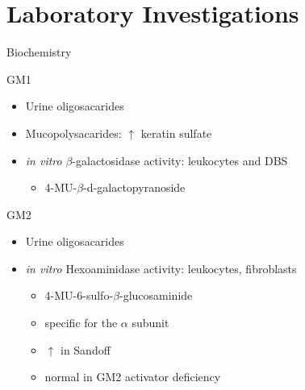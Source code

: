 \documentclass[presentation, smaller]{beamer}
\begin{document}
\section{Laboratory Investigations}
\label{sec:orgheadline17}

\begin{frame}[label={sec:orgheadline16}]{Biochemistry}
\begin{block}{GM1}
\begin{itemize}
\item Urine oligosacarides
\item Mucopolysacarides: \(\uparrow\) keratin sulfate
\item \emph{in vitro} \(\beta\)-galactosidase activity: leukocytes and DBS
\begin{itemize}
\item 4-MU-\(\beta\)-d-galactopyranoside
\end{itemize}
\end{itemize}
\end{block}

\begin{block}{GM2}
\begin{itemize}
\item Urine oligosacarides
\item \emph{in vitro} Hexoaminidase activity: leukocytes, fibroblasts
\begin{itemize}
\item 4-MU-6-sulfo-\(\beta\)-glucosaminide
\item specific for the \(\alpha\) subunit
\item \(\uparrow\) in Sandoff
\item normal in GM2 activator deficiency
\end{itemize}
\end{itemize}
\end{block}
\end{frame}
\end{document}
